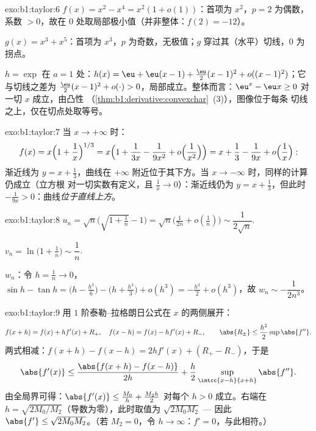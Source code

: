 \begin{solution}{exo:b1:taylor:6}
$f(x) = x^2 - x^4 = x^2(1 + o(1))$：首项为 $x^2$，$p = 2$ 为偶数，
系数 $> 0$，故在 $0$ 处取局部极小值（并非整体：$f(2) = -12$）。

$g(x) = x^3 + x^5$：首项为 $x^3$，$p$ 为奇数，无极值；$g$
穿过其（水平）切线，$0$ 为拐点。

$h = \exp$ 在 $a = 1$ 处：$h(x) = \eu + \eu(x-1) + \frac{\eu}{2}(x-1)^2
+ o((x-1)^2)$；它与切线之差为
$\frac{\eu}{2}(x-1)^2 + o(\cdot) > 0$，局部成立。整体而言：$\eu^x -
\eu x \geq 0$ 对一切 $x$ 成立，由凸性
（\cref{thm:b1:derivative:convexchar}~(3)），图像位于每条
切线之上，仅在切点处取等号。
\end{solution}

\begin{solution}{exo:b1:taylor:7}
当 $x \to +\infty$ 时：
\[
f(x) = x\Bigl(1 + \frac1x\Bigr)^{1/3}
= x\Bigl(1 + \frac{1}{3x} - \frac{1}{9x^2} +
o\Bigl(\frac{1}{x^2}\Bigr)\Bigr)
= x + \frac13 - \frac{1}{9x} + o\Bigl(\frac1x\Bigr):
\]
渐近线为 $y = x + \frac13$，曲线在 $+\infty$ 附近位于其下方。当 $x
\to -\infty$ 时，同样的计算仍成立（立方根
对一切实数有定义，且 $\frac1x \to 0$）：渐近线仍为 $y = x +
\frac13$，但此时 $-\frac{1}{9x} > 0$：曲线\emph{位于直线上方}。
\end{solution}

\begin{solution}{exo:b1:taylor:8}
$u_n = \sqrt n\bigl(\sqrt{1 + \tfrac1n} - 1\bigr) = \sqrt
n\bigl(\frac{1}{2n} + o(\frac1n)\bigr) \sim \dfrac{1}{2\sqrt n}$.

$v_n = \ln\bigl(1 + \frac1n\bigr) \sim \dfrac 1n$.

$w_n$：令 $h = \frac1n \to 0$，$\sin h - \tan h = \bigl(h -
\frac{h^3}{6}\bigr) - \bigl(h + \frac{h^3}{3}\bigr) + o(h^3) =
-\frac{h^3}{2} + o(h^3)$，故 $w_n \sim -\dfrac{1}{2n^3}$。
\end{solution}

\begin{solution}{exo:b1:taylor:9}
用 $1$ 阶泰勒–拉格朗日公式在 $x$ 的两侧展开：
\[
f(x + h) = f(x) + h f'(x) + R_+,\quad
f(x - h) = f(x) - h f'(x) + R_-,
\qquad \abs{R_\pm} \leq \frac{h^2}{2} \sup \abs{f''} .
\]
两式相减：$f(x+h) - f(x-h) = 2h f'(x) + (R_+ - R_-)$，于是
\[
\abs{f'(x)} \leq \frac{\abs{f(x+h) - f(x-h)}}{2h} +
\frac{h}{2}\sup_{\intcc{x-h}{x+h}}\abs{f''} .
\]
由全局界可得：$\abs{f'(x)} \leq \frac{M_0}{h} + \frac{M_2
h}{2}$ 对每个 $h > 0$ 成立。右端在 $h =
\sqrt{2M_0/M_2}$（导数为零），此时取值为 $\sqrt{2M_0M_2}$
--- 因此 $\abs{f'} \leq \sqrt{2M_0M_2}$。（若 $M_2 = 0$，令 $h \to
\infty$：$f' = 0$，与此相符。）
\end{solution}

